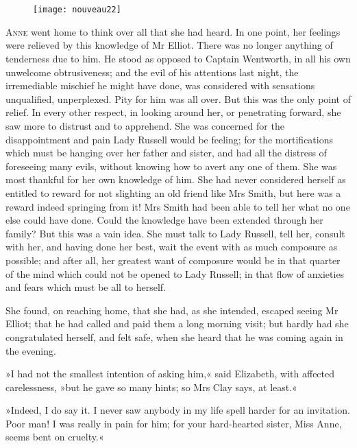 \chapter[Chapter \thechapter]{}

\begin{figure}[t!]
\centering
\texttt{[image: nouveau22]}
\end{figure}

\lettrine[lines=4,lraise=0.3]{A}{nne} went home to think over all that she had heard. In one point, her feelings were relieved by this knowledge of Mr Elliot. There was no longer anything of tenderness due to him. He stood as opposed to Captain Wentworth, in all his own unwelcome obtrusiveness; and the evil of his attentions last night, the irremediable mischief he might have done, was considered with sensations unqualified, unperplexed. Pity for him was all over. But this was the only point of relief. In every other respect, in looking around her, or penetrating forward, she saw more to distrust and to apprehend. She was concerned for the disappointment and pain Lady Russell would be feeling; for the mortifications which must be hanging over her father and sister, and had all the distress of foreseeing many evils, without knowing how to avert any one of them. She was most thankful for her own knowledge of him. She had never considered herself as entitled to reward for not slighting an old friend like Mrs Smith, but here was a reward indeed springing from it! Mrs Smith had been able to tell her what no one else could have done. Could the knowledge have been extended through her family? But this was a vain idea. She must talk to Lady Russell, tell her, consult with her, and having done her best, wait the event with as much composure as possible; and after all, her greatest want of composure would be in that quarter of the mind which could not be opened to Lady Russell; in that flow of anxieties and fears which must be all to herself.

She found, on reaching home, that she had, as she intended, escaped seeing Mr Elliot; that he had called and paid them a long morning visit; but hardly had she congratulated herself, and felt safe, when she heard that he was coming again in the evening.

»I had not the smallest intention of asking him,« said Elizabeth, with affected carelessness, »but he gave so many hints; so Mrs Clay says, at least.«

»Indeed, I do say it. I never saw anybody in my life spell harder for an invitation. Poor man! I was really in pain for him; for your hard-hearted sister, Miss Anne, seems bent on cruelty.«

